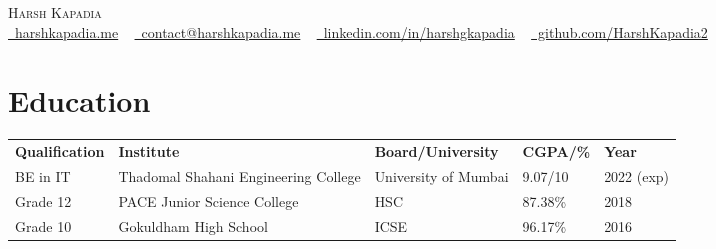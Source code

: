 \documentclass[letterpaper,11pt]{article}
\begin{document}

\begin{center}
    {\Huge \scshape Harsh Kapadia} \\ \vspace{2pt}
    \small
    \faGlobe \href{https://harshkapadia.me}{\raisebox{-0.1\height}\ harshkapadia.me} ~
    \faEnvelope \href{mailto:contact@harshkapadia.me}{\raisebox{-0.2\height}\  contact@harshkapadia.me} ~
    \faLinkedin \href{https://linkedin.com/in/harshgkapadia}{\raisebox{-0.2\height}\ linkedin.com/in/harshgkapadia} ~
    \faGithub \href{https://github.com/HarshKapadia2}{\raisebox{-0.2\height}\ github.com/HarshKapadia2}
    \vspace{-13pt}
\end{center}


\section{Education}
    \vspace{-2pt}
    \begin{itemize}[leftmargin=0.2in, label={}]
        {\item{
            \begin{tabular}{ l@{\hskip 0.2in} l@{\hskip 0.2in} l@{\hskip 0.2in} l@{\hskip 0.2in} l }
                 \textbf{Qualification} & \textbf{Institute} & \textbf{Board/University} & \textbf{CGPA/\%} & \textbf{Year} \\ 
                 BE in IT & Thadomal Shahani Engineering College & University of Mumbai & 9.07/10 & 2022 (exp) \\
                 Grade 12 & PACE Junior Science College & HSC & 87.38\% & 2018 \\
                 Grade 10 & Gokuldham High School & ICSE & 96.17\% & 2016
            \end{tabular}
        }}
    \end{itemize}
\vspace{-20pt}
\end{document}
